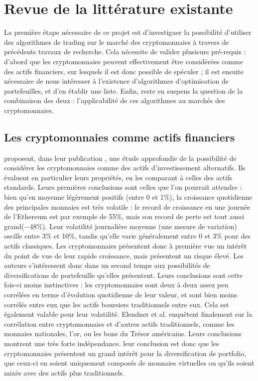 \documentclass[a4paper, 10pt]{article}
\begin{document}
\newpage
\section{Revue de la littérature existante}
\label{sec:review}

La première étape nécessaire de ce projet est d'investiguer la possibilité d'utiliser des algorithmes de trading sur le marché des cryptomonnaies à travers de précédents travaux de recherche. Cela nécessite de valider plusieurs pré-requis : d'abord que les cryptomonnaies peuvent effectivement être considérées comme des actifs financiers, sur lesquels il est donc possible de spéculer ; il est ensuite nécessaire de nous intéresser à l'existence d’algorithmes d'optimisation de portefeuilles, et d'en établir une liste. Enfin, reste en suspens la question de la combinaison des deux : l'applicabilité de ces algorithmes au marchés des cryptomonnaies.

\subsection{Les cryptomonnaies comme actifs financiers}
\label{sec:review_actifs}

\textbf{\citet{Elendner2018}} proposent, dans leur publication \textbf{}, une étude approfondie de la possibilité de considérer les cryptomonnaies comme des actifs d'investissement alternatifs. Ils évaluent en particulier leurs propriétés, en les comparant à celles des actifs standards. Leurs premières conclusions sont celles que l'on pourrait attendre : bien qu'en moyenne légèrement positifs (entre 0 et 1\%), la croissance quotidienne des principales monnaies est très volatile : le record de croissance en une journée de l'Ethereum est par exemple de 55\%, mais son record de perte est tout aussi grand($-48\%$). Leur volatilité journalière moyenne (une mesure de variation) oscille entre 3\% et 10\%, tandis qu'elle varie généralement entre 0 et 3\% pour des actifs classiques. Les cryptomonnaies présentent donc à première vue un intérêt du point de vue de leur rapide croissance, mais présentent un risque élevé. Les auteurs s'intéressent donc dans un second temps aux possibilités de diversifications de portefeuille qu'elles présentent. Leurs conclusions sont cette fois-ci moins instinctives : les cryptomonnaies sont deux à deux assez peu corrélées en terme d'évolution quotidienne de leur valeur, et sont bien moins corrélés entre eux que les actifs boursiers traditionnels entre eux. Cela est également valable pour leur volatilité. Elendner et al. enquêtent finalement sur la corrélation entre cryptomonnaies et d'autres actifs traditionnels, comme les monnaies nationales, l'or, ou les bons du Trésor américains. Leurs conclusions montrent une très forte indépendance. leur conclusion est donc que les cryptomonnaies présentent un grand intérêt pour la diversification de portfolio, que ceux-ci en soient uniquement composés de monnaies virtuelles ou qu'ils soient mixés avec des actifs plus traditionnels.
\end{document}
